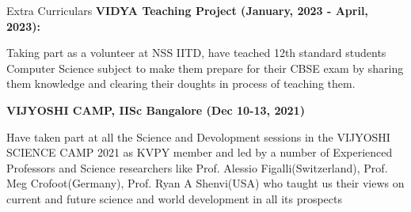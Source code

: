 \begin{rubric}{Extra Curriculars}
    \entry*
    \textbf{VIDYA Teaching Project (January, 2023 - April, 2023):}\par
     Taking part as a volunteer at NSS IITD, have teached 12th
standard students Computer Science subject to make them prepare for their CBSE exam by sharing them knowledge and
clearing their doughts in process of teaching them.

    \entry*
    \textbf{VIJYOSHI CAMP, IISc Bangalore (Dec 10-13, 2021)} \par
 Have taken part at all the Science and Devolopment sessions in
the VIJYOSHI SCIENCE CAMP 2021 as KVPY member and led by a number of Experienced Professors and Science
researchers like Prof. Alessio Figalli(Switzerland), Prof. Meg Crofoot(Germany), Prof. Ryan A Shenvi(USA) who
taught us their views on current and future science and world development in all its prospects
\end{rubric}